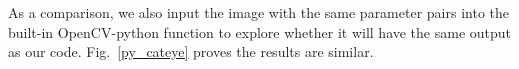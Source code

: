 \documentclass[12pt]{article}
\begin{document}
As a comparison, we also input the image with the same parameter pairs into the built-in OpenCV-python function to explore whether it will have the same output as our code. Fig.~\ref{py_cateye} proves the results are similar. 


\begin{figure}[H]
  \centering
  \quad
  \quad
  \quad


\end{figure}
\end{document}
